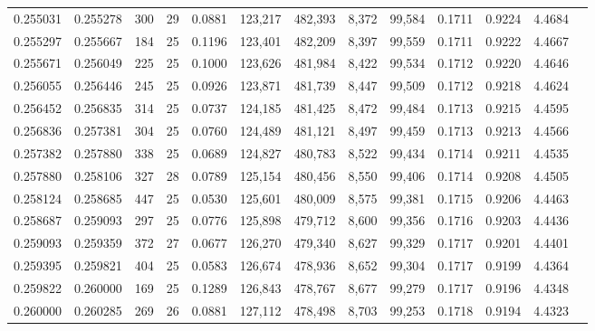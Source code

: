 \begin{tabular}{rrrrrrrrrrrrr}
0.255031 & 0.255278 &   300 &  29 &                                     0.0881 & 123,217 & 482,393 &   8,372 &  99,584 & 0.1711 & 0.9224 & 4.4684 \\
0.255297 & 0.255667 &   184 &  25 &                                     0.1196 & 123,401 & 482,209 &   8,397 &  99,559 & 0.1711 & 0.9222 & 4.4667 \\
0.255671 & 0.256049 &   225 &  25 &                                     0.1000 & 123,626 & 481,984 &   8,422 &  99,534 & 0.1712 & 0.9220 & 4.4646 \\
0.256055 & 0.256446 &   245 &  25 &                                     0.0926 & 123,871 & 481,739 &   8,447 &  99,509 & 0.1712 & 0.9218 & 4.4624 \\
0.256452 & 0.256835 &   314 &  25 &                                     0.0737 & 124,185 & 481,425 &   8,472 &  99,484 & 0.1713 & 0.9215 & 4.4595 \\
0.256836 & 0.257381 &   304 &  25 &                                     0.0760 & 124,489 & 481,121 &   8,497 &  99,459 & 0.1713 & 0.9213 & 4.4566 \\
0.257382 & 0.257880 &   338 &  25 &                                     0.0689 & 124,827 & 480,783 &   8,522 &  99,434 & 0.1714 & 0.9211 & 4.4535 \\
0.257880 & 0.258106 &   327 &  28 &                                     0.0789 & 125,154 & 480,456 &   8,550 &  99,406 & 0.1714 & 0.9208 & 4.4505 \\
0.258124 & 0.258685 &   447 &  25 &                                     0.0530 & 125,601 & 480,009 &   8,575 &  99,381 & 0.1715 & 0.9206 & 4.4463 \\
0.258687 & 0.259093 &   297 &  25 &                                     0.0776 & 125,898 & 479,712 &   8,600 &  99,356 & 0.1716 & 0.9203 & 4.4436 \\
0.259093 & 0.259359 &   372 &  27 &                                     0.0677 & 126,270 & 479,340 &   8,627 &  99,329 & 0.1717 & 0.9201 & 4.4401 \\
0.259395 & 0.259821 &   404 &  25 &                                     0.0583 & 126,674 & 478,936 &   8,652 &  99,304 & 0.1717 & 0.9199 & 4.4364 \\
0.259822 & 0.260000 &   169 &  25 &                                     0.1289 & 126,843 & 478,767 &   8,677 &  99,279 & 0.1717 & 0.9196 & 4.4348 \\
0.260000 & 0.260285 &   269 &  26 &                                     0.0881 & 127,112 & 478,498 &   8,703 &  99,253 & 0.1718 & 0.9194 & 4.4323 \\

\end{tabular}
